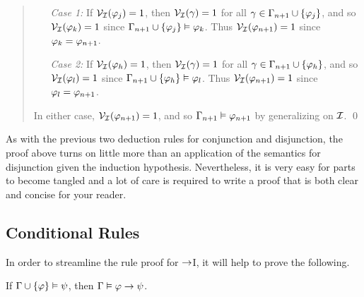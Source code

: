 \begin{quote}
  \begin{enumerate}[leftmargin=.75in]
    \item[\it Case 1:] 
      If $\mathcal{V}_{\mathcal{I}}(\varphi_j) = 1$, then $\mathcal{V}_{\mathcal{I}}(\gamma) = 1$ for all $\gamma \in \Gamma_{n+1}\cup\lbrace\varphi_j\rbrace$, and so $\mathcal{V}_{\mathcal{I}}(\varphi_k) = 1$ since $\Gamma_{n+1}\cup\lbrace\varphi_j\rbrace \vDash \varphi_k$.
      Thus $\mathcal{V}_{\mathcal{I}}(\varphi_{n+1}) = 1$ since $\varphi_k=\varphi_{n+1}$. 
    \item[\it Case 2:] 
      If $\mathcal{V}_{\mathcal{I}}(\varphi_h) = 1$, then $\mathcal{V}_{\mathcal{I}}(\gamma) = 1$ for all $\gamma \in \Gamma_{n+1}\cup\lbrace\varphi_h\rbrace$, and so $\mathcal{V}_{\mathcal{I}}(\varphi_l) = 1$ since $\Gamma_{n+1}\cup\lbrace\varphi_h\rbrace \vDash \varphi_l$. 
      Thus $\mathcal{V}_{\mathcal{I}}(\varphi_{n+1}) = 1$ since $\varphi_l=\varphi_{n+1}$. 
  \end{enumerate}

  In either case, $\mathcal{V}_{\mathcal{I}}(\varphi_{n+1}) = 1$, and so $\Gamma_{n+1} \vDash \varphi_{n+1}$ by generalizing on $\mathcal{I}$.
  \qed
\end{quote}

As with the previous two deduction rules for conjunction and disjunction, the proof above turns on little more than an application of the semantics for disjunction given the induction hypothesis.
Nevertheless, it is very easy for parts to become tangled and a lot of care is required to write a proof that is both clear and concise for your reader.




\subsection{Conditional Rules}%
  \label{sub:ConditionalRules}
  
In order to streamline the rule proof for $\rightarrow$I, it will help to prove the following. %

\begin{Lthm} \label{lemma:PL-conditional}
  If $\Gamma \cup \lbrace\varphi\rbrace \vDash \psi$, then $\Gamma \vDash \varphi \rightarrow \psi$.
\end{Lthm}
\vspace{-.2in}

